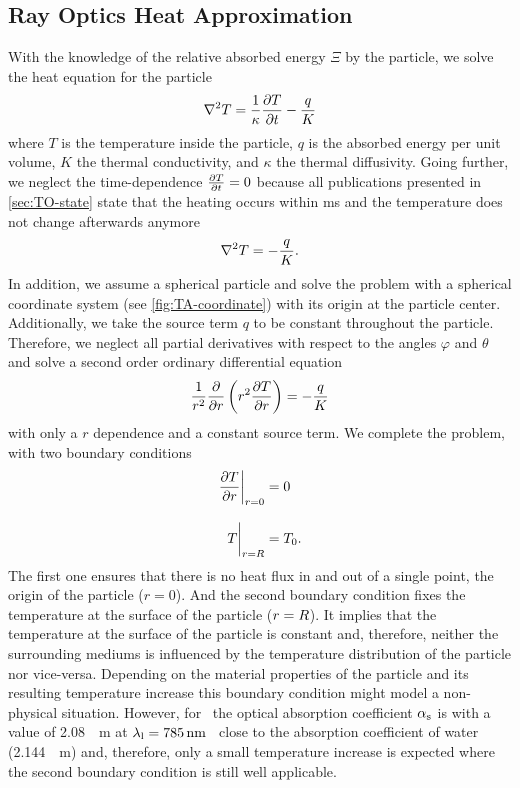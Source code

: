 \subsection{Ray Optics Heat Approximation}

With the knowledge of the relative absorbed energy $\Xi$ by the particle, we 
solve the heat equation for the particle
\begin{equation}
  \laplacian{T} = \frac{1}{\kappa} \pdv{T}{t} - \frac{q}{K}
  \label{eq:TO-heat-prob}
\end{equation}
where $T$ is the temperature inside the particle, $q$ is the absorbed energy 
per unit volume, $K$ the thermal conductivity, and $\kappa$ the thermal 
diffusivity. Going further, we neglect the time-dependence $\pdv{T}{t}= 0$ 
because all publications presented in \cref{sec:TO-state} state that the 
heating occurs within \si{\ms} and the temperature does not change afterwards 
anymore \begin{equation}
  \laplacian{T} = - \frac{q}{K}.
  \label{eq:TO-heat-stat}
\end{equation}
 In addition, we assume a spherical particle and solve the problem with a 
 spherical coordinate system (see \cref{fig:TA-coordinate}) with its origin at 
 the particle center. Additionally, we take the source term $q$ to be constant 
 throughout the particle. Therefore, we neglect all partial derivatives with 
 respect to the angles $\varphi$ and $\theta$ and solve a second order ordinary 
 differential equation
 \begin{equation}
    \frac{1}{r^{2}}\pdv{r}\left( r^{2}\pdv{T}{r} \right) = - \frac{q}{K}
  \label{eq:TO-heat-spherical}
\end{equation}
with only a $r$ dependence and a constant source term. We complete the problem, 
with two boundary conditions
\begin{subequations}
\begin{align}
  \eval{\pdv{T}{r}}_{r=0} &= 0 \label{eq:TO-heat-BC1}\\[3mm]
  \eval{T}_{r=\R} &= T_{0} \label{eq:TO-heat-BC2}.
\end{align}
\end{subequations}
The first one ensures that there is no heat flux in and out of a single point, 
the origin of the particle ($r=0$). And the second boundary condition fixes the 
temperature at the surface of the particle ($r=R$). It implies that the 
temperature at the surface of the particle is constant and, therefore, neither 
the surrounding mediums is influenced by the temperature distribution of the 
particle nor vice-versa. Depending on the material properties of the particle 
and its resulting temperature increase this boundary condition might model a 
non-physical situation. However, for \SiO~the optical absorption coefficient 
$\alpha_{\mathrm{s}}$ is with a value of \SI{2.08}{\per\meter} at 
$\lal=\SI{785}{\nm}$~\cite{Kitamura2007} close to the absorption coefficient of 
water (\SI{2.144}{\per\meter}) and, therefore, only a small temperature 
increase is expected where the second boundary condition is still well 
applicable.

